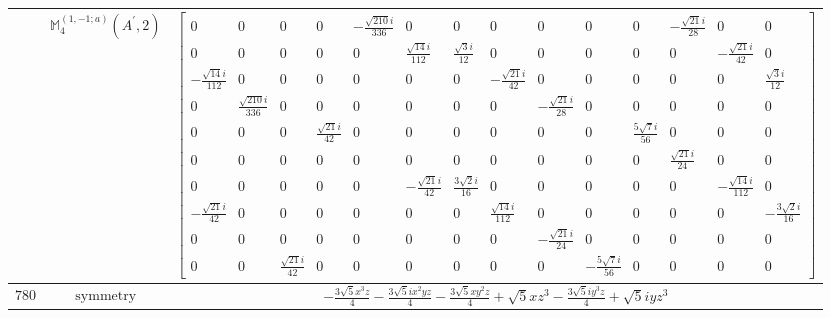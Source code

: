 \documentclass[fleqn,8pt,landscape]{jsarticle}
\begin{document}
\begin{longtable}{ccc}
$  $ & $ \mathbb{M}_{4}^{(1,-1;a)}(A^{\prime},2) $ & $ \begin{bmatrix} 0 & 0 & 0 & 0 & - \frac{\sqrt{210} i}{336} & 0 & 0 & 0 & 0 & 0 & 0 & - \frac{\sqrt{21} i}{28} & 0 & 0 \\ 0 & 0 & 0 & 0 & 0 & \frac{\sqrt{14} i}{112} & \frac{\sqrt{3} i}{12} & 0 & 0 & 0 & 0 & 0 & - \frac{\sqrt{21} i}{42} & 0 \\ - \frac{\sqrt{14} i}{112} & 0 & 0 & 0 & 0 & 0 & 0 & - \frac{\sqrt{21} i}{42} & 0 & 0 & 0 & 0 & 0 & \frac{\sqrt{3} i}{12} \\ 0 & \frac{\sqrt{210} i}{336} & 0 & 0 & 0 & 0 & 0 & 0 & - \frac{\sqrt{21} i}{28} & 0 & 0 & 0 & 0 & 0 \\ 0 & 0 & 0 & \frac{\sqrt{21} i}{42} & 0 & 0 & 0 & 0 & 0 & 0 & \frac{5 \sqrt{7} i}{56} & 0 & 0 & 0 \\ 0 & 0 & 0 & 0 & 0 & 0 & 0 & 0 & 0 & 0 & 0 & \frac{\sqrt{21} i}{24} & 0 & 0 \\ 0 & 0 & 0 & 0 & 0 & - \frac{\sqrt{21} i}{42} & \frac{3 \sqrt{2} i}{16} & 0 & 0 & 0 & 0 & 0 & - \frac{\sqrt{14} i}{112} & 0 \\ - \frac{\sqrt{21} i}{42} & 0 & 0 & 0 & 0 & 0 & 0 & \frac{\sqrt{14} i}{112} & 0 & 0 & 0 & 0 & 0 & - \frac{3 \sqrt{2} i}{16} \\ 0 & 0 & 0 & 0 & 0 & 0 & 0 & 0 & - \frac{\sqrt{21} i}{24} & 0 & 0 & 0 & 0 & 0 \\ 0 & 0 & \frac{\sqrt{21} i}{42} & 0 & 0 & 0 & 0 & 0 & 0 & - \frac{5 \sqrt{7} i}{56} & 0 & 0 & 0 & 0 \end{bmatrix} $ \\ \hline
$ 780 $ & $ \text{symmetry} $ & $ - \frac{3 \sqrt{5} x^{3} z}{4} - \frac{3 \sqrt{5} i x^{2} y z}{4} - \frac{3 \sqrt{5} x y^{2} z}{4} + \sqrt{5} x z^{3} - \frac{3 \sqrt{5} i y^{3} z}{4} + \sqrt{5} i y z^{3} $ \\

\end{longtable}
\end{document}
